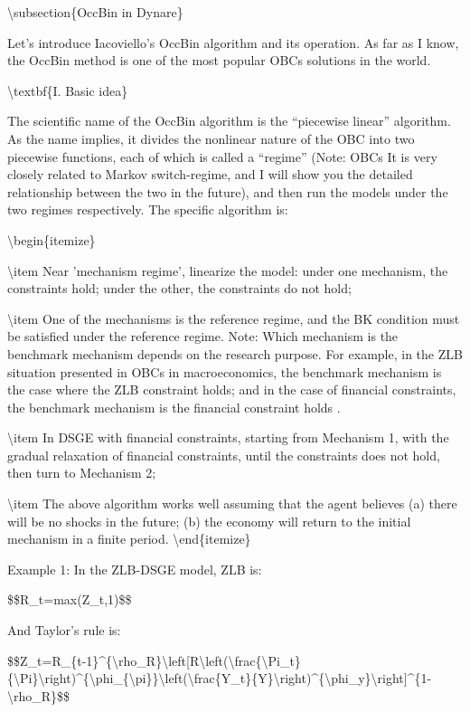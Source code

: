 \documentclass[10pt,math=newtx,citestyle=gb7714-2015,bibstyle=gb7714-2015]{elegantbook}
\begin{document}
	\textbackslash{}subsection\{OccBin in Dynare\}
	
	Let's introduce Iacoviello's OccBin algorithm and its operation. As far as I know, the OccBin method is one of the most popular OBCs solutions in the world.
	
	\textbackslash{}textbf\{I. Basic idea\}
	
	The scientific name of the OccBin algorithm is the ``piecewise linear'' algorithm. As the name implies, it divides the nonlinear nature of the OBC into two piecewise functions, each of which is called a ``regime'' (Note: OBCs It is very closely related to Markov switch-regime, and I will show you the detailed relationship between the two in the future), and then run the models under the two regimes respectively. The specific algorithm is:
	
	\textbackslash{}begin\{itemize\}
	
	\textbackslash{}item Near 'mechanism regime', linearize the model: under one mechanism, the constraints hold; under the other, the constraints do not hold;
	
	\textbackslash{}item One of the mechanisms is the reference regime, and the BK condition must be satisfied under the reference regime. Note: Which mechanism is the benchmark mechanism depends on the research purpose. For example, in the ZLB situation presented in OBCs in macroeconomics, the benchmark mechanism is the case where the ZLB constraint holds; and in the case of financial constraints, the benchmark mechanism is the financial constraint holds .
	
	\textbackslash{}item In DSGE with financial constraints, starting from Mechanism 1, with the gradual relaxation of financial constraints, until the constraints does not hold, then turn to Mechanism 2;
	
	\textbackslash{}item The above algorithm works well assuming that the agent believes (a) there will be no shocks in the future; (b) the economy will return to the initial mechanism in a finite period.
	\textbackslash{}end\{itemize\}
	
	Example 1: In the ZLB-DSGE model, ZLB is:
	
	\$\$R\_t=max(Z\_t,1)\$\$
	
	And Taylor's rule is:
	
	\$\$Z\_t=R\_\{t-1\}\^{}\{\textbackslash{}rho\_R\}\textbackslash{}left[R\textbackslash{}left(\textbackslash{}frac\{\textbackslash{}Pi\_t\}\{\textbackslash{}Pi\}\textbackslash{}right)\^{}\{\textbackslash{}phi\_\{\textbackslash{}pi\}\}\textbackslash{}left(\textbackslash{}frac\{Y\_t\}\{Y\}\textbackslash{}right)\^{}\{\textbackslash{}phi\_y\}\textbackslash{}right]\^{}\{1-\textbackslash{}rho\_R\}\$\$
	
\end{document}
